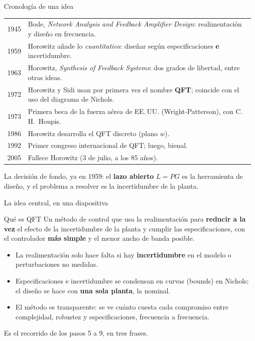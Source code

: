 \documentclass[aspectratio=169,11pt]{beamer}
\begin{document}
\begin{frame}{Cronología de una idea}
  \small
  \begin{center}
  \footnotesize
  \begin{tabular}{rl}
    \hline
    1945 & Bode, \emph{Network Analysis and Feedback Amplifier Design}: realimentación y diseño en frecuencia.\\
    1959 & Horowitz añade lo \emph{cuantitativo}: diseñar según especificaciones \textbf{e} incertidumbre.\\
    1963 & Horowitz, \emph{Synthesis of Feedback Systems}: dos grados de libertad, entre otras ideas.\\
    1972 & Horowitz y Sidi usan por primera vez el nombre \textbf{QFT}; coincide con el uso del diagrama de Nichols.\\
    1973 & Primera beca de la fuerza aérea de EE.\,UU. (Wright-Patterson), con C.\,H.\ Houpis.\\
    1986 & Horowitz desarrolla el QFT discreto (plano $w$).\\
    1992 & Primer congreso internacional de QFT; luego, bienal.\\
    2005 & Fallece Horowitz (3 de julio, a los 85 años).\\
    \hline
  \end{tabular}
  \end{center}
  \footnotesize La decisión de fondo, ya en 1959: el \textbf{lazo abierto} $L=PG$ es la herramienta de diseño, y el problema a resolver es la incertidumbre de la planta.
\end{frame}

\begin{frame}{La idea central, en una diapositiva}
  \small
  \begin{block}{Qué es QFT}
    Un método de control que usa la realimentación para \textbf{reducir a la vez} el efecto de la incertidumbre de la planta y cumplir las especificaciones, con el controlador \textbf{más simple} y el menor ancho de banda posible.
  \end{block}
  \begin{itemize}
    \item La realimentación solo hace falta si hay \textbf{incertidumbre} en el modelo o perturbaciones no medidas.
    \item Especificaciones e incertidumbre se condensan en curvas (bounds) en Nichols; el diseño se hace con \textbf{una sola planta}, la nominal.
    \item El método es transparente: se ve cuánto cuesta cada compromiso entre complejidad, robustez y especificaciones, frecuencia a frecuencia.
  \end{itemize}
  \footnotesize Es el recorrido de los pasos 5 a 9, en tres frases.
\end{frame}
\end{document}
